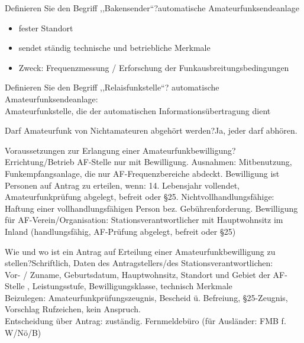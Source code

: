 \documentclass[avery5371,grid,frame,a4paper]{flashcards}
\newcommand{\card}[3]{
  \begin{flashcard}[{\chap} -- #1]{#2}#3\end{flashcard}
}
\begin{document}
\card{23}{Definieren Sie den Begriff ,,Bakensender``?}{automatische Amateurfunksendeanlage\begin{itemize}\itemsep1pt \item fester Standort \item sendet ständig technische und betriebliche Merkmale \item Zweck: Frequenzmessung / Erforschung der Funkausbreitungsbedingungen\end{itemize}}

\card{24}{Definieren Sie den Begriff ,,Relaisfunkstelle``?}{
  automatische Amateurfunksendeanlage: \\
  Amateurfunkstelle, die der automatischen Informationsübertragung dient
}

\card{25}{ Darf Amateurfunk von Nichtamateuren abgehört werden?}{Ja, jeder darf abhören.}

\card{26}{Voraussetzungen zur Erlangung einer Amateurfunkbewilligung?}{Errichtung/Betrieb AF-Stelle nur mit Bewilligung. Ausnahmen:  Mitbenutzung, Funkempfangsanlage, die nur AF-Frequenzbereiche abdeckt. Bewilligung ist Personen auf Antrag zu erteilen, wenn: 14. Lebensjahr vollendet, Amateurfunkprüfung abgelegt, befreit oder §25. Nichtvollhandlungsfähige: Haftung einer vollhandlungsfähigen Person bez. Gebührenforderung. Bewilligung für AF-Verein/Organisation: Stationsverantwortlicher mit Hauptwohnsitz im Inland (handlungsfähig, AF-Prüfung abgelegt, befreit oder §25)}

\card{27}{Wie und wo ist ein Antrag auf Erteilung einer Amateurfunkbewilligung zu stellen?}{Schriftlich, Daten des Antragstellers/des Stationsverantwortlichen:\\ Vor- / Zuname, Geburtsdatum, Hauptwohnsitz, Standort und Gebiet der AF-Stelle , Leistungsstufe, Bewilligungsklasse, technisch Merkmale \\ Beizulegen: Amateurfunkprüfungszeugnis, Bescheid ü. Befreiung, §25-Zeugnis, Vorschlag Rufzeichen, kein Anspruch. \\ Entscheidung über Antrag: zuständig. Fernmeldebüro (für Ausländer: FMB f. W/Nö/B)}

\end{document}
